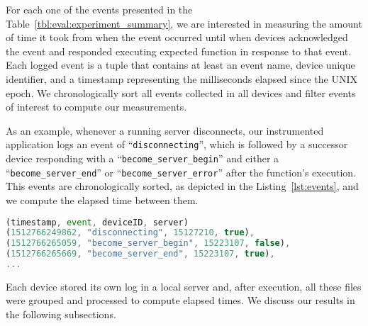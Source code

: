 For each one of the events presented in the Table~\ref{tbl:eval:experiment_summary}, we are interested in measuring the amount of time it took from when the event occurred until when devices acknowledged the event and responded executing expected function in response to that event. 
Each logged event is a tuple that contains at least an event name, device unique identifier, and a timestamp representing the milliseconds elapsed since the UNIX epoch.
We chronologically sort all events collected in all devices and filter events of interest to compute our measurements.


As an example, whenever a running server disconnects, our instrumented application logs an event of ``{\texttt{disconnecting}}'', which is followed by a successor device responding with a ``{\texttt{become\_server\_begin}}'' and either a ``{\texttt{become\_server\_end}}'' or ``{\texttt{become\_server\_error}}'' after the function's execution. This events are chronologically sorted, as depicted in the Listing~\ref{lst:events}, and we compute the elapsed time between them.

\begin{tiny}
\begin{lstlisting}[caption={Tuples with logged events},label={lst:events}, language=JavaScript]
(timestamp, event, deviceID, server)
(1512766249862, "disconnecting", 15127210, true),
(1512766265059, "become_server_begin", 15223107, false),
(1512766265669, "become_server_end", 15223107, true),
...
\end{lstlisting}    
\end{tiny}


Each device stored its own log in a local server and, after execution, all these files were grouped and processed to compute elapsed times. 
We discuss our results in the following subsections.



